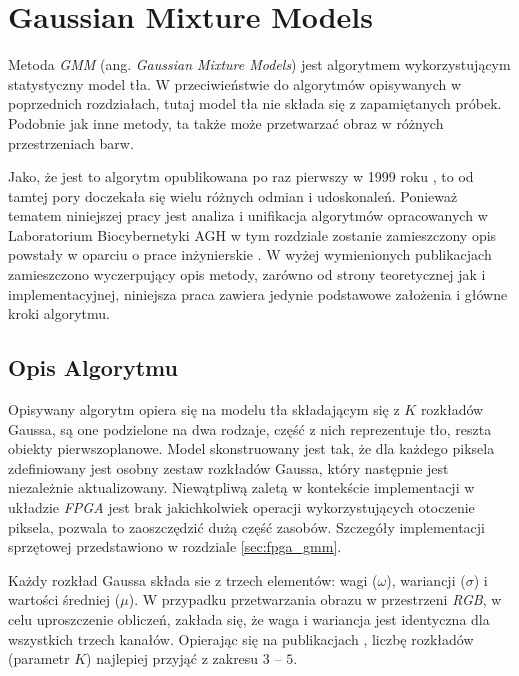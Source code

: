 \section{Gaussian Mixture Models}
\label{sec:gmm_teoria}

Metoda \textit{GMM} (ang. \textit{Gaussian Mixture Models}) jest algorytmem wykorzystującym statystyczny model tła. W przeciwieństwie do algorytmów opisywanych w poprzednich rozdziałach, tutaj model tła nie składa się z zapamiętanych próbek. Podobnie jak inne metody, ta także może przetwarzać obraz w różnych przestrzeniach barw. 

Jako, że jest to algorytm opublikowana po raz pierwszy w 1999 roku \cite{Stauffer_Grimson_99}, to od tamtej pory doczekała się wielu różnych odmian i udoskonaleń. Ponieważ tematem niniejszej pracy jest analiza i unifikacja algorytmów opracowanych w Laboratorium Biocybernetyki AGH w tym rozdziale zostanie zamieszczony opis powstały w oparciu o prace inżynierskie \cite{janus_15, piszczek_15}. W wyżej wymienionych publikacjach zamieszczono wyczerpujący opis metody, zarówno od strony teoretycznej jak i implementacyjnej, niniejsza praca zawiera jedynie podstawowe założenia i główne kroki algorytmu.


\subsection{Opis Algorytmu}
\label{subsec:gmm_opis}


Opisywany algorytm opiera się na modelu tła składającym się z $K$ rozkładów Gaussa, są one podzielone na dwa rodzaje, część z nich reprezentuje tło, reszta obiekty pierwszoplanowe. Model skonstruowany jest tak, że dla każdego piksela zdefiniowany jest osobny zestaw rozkładów Gaussa, który następnie jest niezależnie aktualizowany. Niewątpliwą zaletą w kontekście implementacji w układzie \textit{FPGA} jest brak jakichkolwiek operacji wykorzystujących otoczenie piksela, pozwala to zaoszczędzić dużą część zasobów. Szczegóły implementacji sprzętowej przedstawiono w rozdziale \ref{sec:fpga_gmm}.

Każdy rozkład Gaussa składa sie z trzech elementów: wagi ($\omega$), wariancji ($\sigma$) i wartości średniej ($\mu$). W przypadku przetwarzania obrazu w przestrzeni \textit{RGB}, w celu uproszczenie obliczeń, zakłada się, że waga i wariancja jest identyczna dla wszystkich trzech kanałów. Opierając się na publikacjach \cite{Stauffer_Grimson_99, piszczek_15}, liczbę rozkładów (parametr $K$) najlepiej przyjąć z zakresu $3$ -- $5$.  


